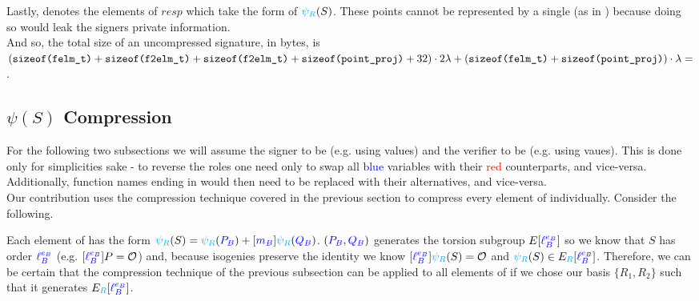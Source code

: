 Lastly,  denotes the elements of $resp$ which take the form of $\textcolor{cyan}{\psi_R}(S)$. These points cannot be represented by a single  (as in ) because doing so would leak the signers private information.\\

\noindent
And so, the total size of an uncompressed \sidh signature, in bytes, is $
(\texttt{sizeof(felm\_t)} + \texttt{sizeof(f2elm\_t)} + \texttt{sizeof(f2elm\_t)} + \texttt{sizeof(point\_proj)} + 32) \cdot 2\lambda + (\texttt{sizeof(felm\_t)} + \texttt{sizeof(point\_proj)}) \cdot \lambda  = $.

\subsection{$\psi(S)$ Compression}

For the following two subsections we will assume the signer to be \bob (e.g. using \rb values) and the verifier to be \alice (e.g. using \ba vaues). This is done only for simplicities sake - to reverse the roles one need only to swap all \textcolor{blue}{blue} variables with their \textcolor{red}{red} counterparts, and vice-versa. Additionally, function names ending in  would then need to be replaced with their  alternatives, and vice-versa.\\

\noindent
Our contribution uses the compression technique covered in the previous section to compress every element of  individually. Consider the following.

Each element of  has the form $\textcolor{cyan}{\psi_R}(S) = \textcolor{cyan}{\psi_R}(\textcolor{blue}{P_B}) + [\textcolor{blue}{m_B}]\textcolor{cyan}{\psi_R}(\textcolor{blue}{Q_B})$. $(\textcolor{blue}{P_B}, \textcolor{blue}{Q_B})$ generates the torsion subgroup $E[\textcolor{blue}{\ell_{B}^{e_B}}]$ so we know that $S$ has order $\textcolor{blue}{\ell_{B}^{e_B}}$ (e.g. $[\textcolor{blue}{\ell_{B}^{e_B}}]P = \mathcal{O}$) and, because isogenies preserve the identity we know $[\textcolor{blue}{\ell_{B}^{e_B}}]\textcolor{cyan}{\psi_R}(S) = \mathcal{O}$ and $\textcolor{cyan}{\psi_R}(S) \in E_{\textcolor{cyan}{R}}[\textcolor{blue}{\ell_{B}^{e_B}}]$. Therefore, we can be certain that the compression technique of the previous subsection can be applied to all elements of  if we chose our basis $\{R_1, R_2\}$ such that it generates $E_{\textcolor{cyan}{R}}[\textcolor{blue}{\ell_{B}^{e_B}}]$. 

